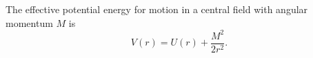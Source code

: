 The effective potential energy for motion in a central field with angular momentum $M$ is
$$V(r) = U(r) + \frac{M^2}{2r^2}.$$

